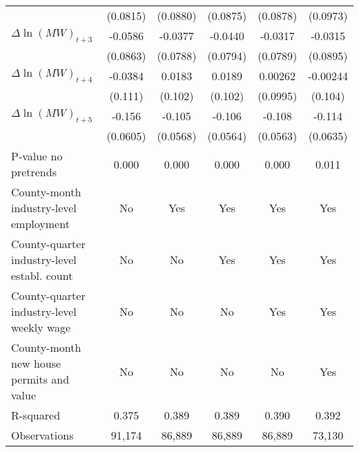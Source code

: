 {\begin{tabular}{l*{5}{c}}
          & (0.0815)         & (0.0880)         & (0.0875)         & (0.0878)         & (0.0973)         \\
[1em]
$\Delta \ln(MW)_{t+3}$&  -0.0586         &  -0.0377         &  -0.0440         &  -0.0317         &  -0.0315         \\
          & (0.0863)         & (0.0788)         & (0.0794)         & (0.0789)         & (0.0895)         \\
[1em]
$\Delta \ln(MW)_{t+4}$&  -0.0384         &   0.0183         &   0.0189         &  0.00262         & -0.00244         \\
          &  (0.111)         &  (0.102)         &  (0.102)         & (0.0995)         &  (0.104)         \\
[1em]
$\Delta \ln(MW)_{t+5}$&   -0.156\sym{**} &   -0.105\sym{*}  &   -0.106\sym{*}  &   -0.108\sym{*}  &   -0.114\sym{*}  \\
          & (0.0605)         & (0.0568)         & (0.0564)         & (0.0563)         & (0.0635)         \\
\hline
P-value no pretrends&    0.000         &    0.000         &    0.000         &    0.000         &    0.011         \\
County-month industry-level employment&       No         &      Yes         &      Yes         &      Yes         &      Yes         \\
County-quarter industry-level establ. count&       No         &       No         &      Yes         &      Yes         &      Yes         \\
County-quarter industry-level weekly wage&       No         &       No         &       No         &      Yes         &      Yes         \\
County-month new house permits and value&       No         &       No         &       No         &       No         &      Yes         \\
R-squared &    0.375         &    0.389         &    0.389         &    0.390         &    0.392         \\
Observations&   91,174         &   86,889         &   86,889         &   86,889         &   73,130         \\
\hline\hline
\end{tabular}
}
